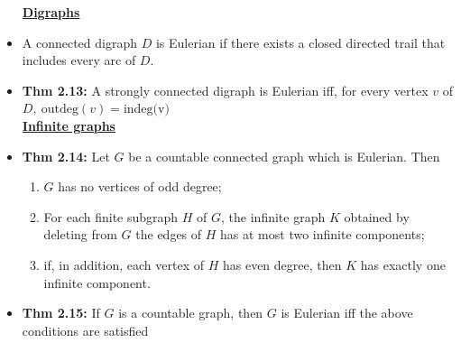 \documentclass[10pt,landscape]{article}
\begin{document}
\begin{multicols}{2}
\begin{itemize}
    \underline{\textbf{Digraphs}}
    \item A connected digraph $D$ is Eulerian if there exists a closed directed trail that includes every arc of $D$.
    \item \textbf{Thm 2.13:} A strongly connected digraph is Eulerian iff, for every vertex $v$ of $D, \ \text{outdeg}(v) = \text{indeg(v)}$ 
    \\
    \underline{\textbf{Infinite graphs}}
    \item \textbf{Thm 2.14:} Let $G$ be a countable connected graph which is Eulerian. Then \begin{enumerate}
        \item $G$ has no vertices of odd degree;
        \item For each finite subgraph $H$ of $G$, the infinite graph $K$ obtained by deleting from $G$ the edges of $H$ has at most two infinite components;
        \item if, in addition, each vertex of $H$ has even degree, then $K$ has exactly one infinite component.
    \end{enumerate}
    \item \textbf{Thm 2.15:} If $G$ is a countable graph, then $G$ is Eulerian iff the above conditions are satisfied
\end{itemize}

\end{multicols}
\end{document}
